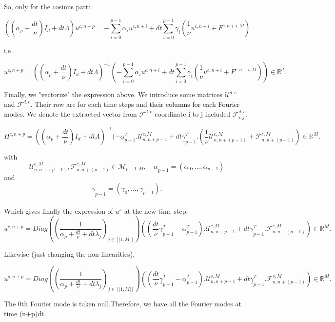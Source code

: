 \documentclass[12pt]{article}
\begin{document}
So, only for the cosinus part:  
  
$$((\alpha_p+\frac{dt}{\nu}) I_d + dt\Lambda)u^{c,n+p}= -\sum_{i=0}^{p-1}\alpha_iu^{c,n+i} + dt\sum_{i=0}^{p-1}\gamma_i (\frac{1}{\nu} u^{c, n+i} + F^{c, n+i, M})$$

i.e 

$$u^{c, n+p}= ((\alpha_p+\frac{dt}{\nu}) I_d + dt\Lambda)^{-1}(-\sum_{i=0}^{p-1}\alpha_iu^{c, n+i} + dt\sum_{i=0}^{p-1}\gamma_i (\frac{1}{\nu} u^{c, n+i} + F^{c, n+i, M})) \in \mathbb{R}^d.$$

Finally, we "vectorize" the expression above. We introduce some matrices $\mathcal{U}^{d,c}$ and $\mathcal{F}^{d,c}$. Their row are for each time steps and their columns for each Fourier modes. We denote the extracted vector from $\mathcal{F}^{d,c}$ coordinate i to j included $\mathcal{F}_{i,j}^{d,c}$.


  $$H^{c, n+p}= ((\alpha_p+\frac{dt}{\nu}) I_d + dt\Lambda)^{-1}(-\underline{\alpha}_{p-1}^T.\mathcal{U}_{n, n+p-1}^{c, M}+ dt \underline{\gamma}_{p-1}^T.(\frac{1}{\nu} \mathcal{U}_{n, n+(p-1)}^{c, M} + \mathcal{F}_{n, n+(p-1)}^{c, M}) \in \mathbb{R}^M.$$

with  
$$\mathcal{U}_{n, n+(p-1)}^{c, M}, \mathcal{F}_{n, n+(p-1)}^{c, M} \in \mathcal{M}_{p-1, M},\quad \underline{\alpha}_{p-1} = (\alpha_0,..., \alpha_{p-1}) $$
and $$\underline{\gamma}_{p-1}= (\gamma_0, ..., \gamma_{p-1}).$$
\\ 

Which gives finally the expression of $u^s$ at the new time step:  
\begin{equation}
    \boxed{
    u^{c, n+p}= Diag((\frac{1}{\alpha_p+\frac{dt}{\nu} + dt\lambda_j})_{j\in [|1, M|]}) ((\frac{dt}{\nu} \underline{\gamma}_{p-1}^T-\underline{\alpha}_{p-1}^T).\mathcal{U}_{n, n+p-1}^{c, M}+ dt \underline{\gamma}_{p-1}^T.\mathcal{F}_{n, n+(p-1)}^{c, M}) \in \mathbb{R}^M.
    }
\end{equation}

Likewise (just changing the non-linearities),

\begin{equation}
    \boxed{
    u^{s, n+p}= Diag((\frac{1}{\alpha_p+\frac{dt}{\nu} + dt\lambda_j})_{j\in [|1, M|]}) ((\frac{dt}{\nu} \underline{\gamma}_{p-1}^T-\underline{\alpha}_{p-1}^T).\mathcal{U}_{n, n+p-1}^{s, M}+ dt \underline{\gamma}_{p-1}^T.\mathcal{F}_{n, n+(p-1)}^{s, M}) \in \mathbb{R}^M.
    }
\end{equation}

The 0th Fourier mode is taken null.Therefore, we have all the Fourier modes at time (n+p)dt.
\end{document}
